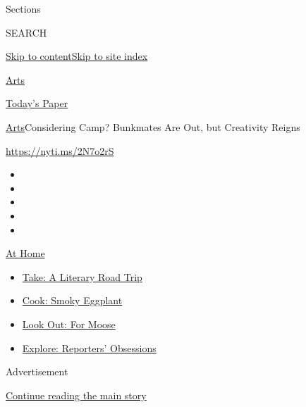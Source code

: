 Sections

SEARCH

\protect\hyperlink{site-content}{Skip to
content}\protect\hyperlink{site-index}{Skip to site index}

\href{https://www.nytimes.com/section/arts}{Arts}

\href{https://myaccount.nytimes.com/auth/login?response_type=cookie\&client_id=vi}{}

\href{https://www.nytimes.com/section/todayspaper}{Today's Paper}

\href{/section/arts}{Arts}\textbar{}Considering Camp? Bunkmates Are Out,
but Creativity Reigns

\url{https://nyti.ms/2N7o2rS}

\begin{itemize}
\item
\item
\item
\item
\item
\end{itemize}

\href{https://www.nytimes.com/spotlight/at-home?action=click\&pgtype=Article\&state=default\&region=TOP_BANNER\&context=at_home_menu}{At
Home}

\begin{itemize}
\tightlist
\item
  \href{https://www.nytimes.com/2020/07/28/books/time-for-a-literary-road-trip.html?action=click\&pgtype=Article\&state=default\&region=TOP_BANNER\&context=at_home_menu}{Take:
  A Literary Road Trip}
\item
  \href{https://www.nytimes.com/2020/07/29/magazine/bored-with-your-home-cooking-some-smoky-eggplant-will-fix-that.html?action=click\&pgtype=Article\&state=default\&region=TOP_BANNER\&context=at_home_menu}{Cook:
  Smoky Eggplant}
\item
  \href{https://www.nytimes.com/2020/07/27/travel/moose-michigan-isle-royale.html?action=click\&pgtype=Article\&state=default\&region=TOP_BANNER\&context=at_home_menu}{Look
  Out: For Moose}
\item
  \href{https://www.nytimes.com/interactive/2020/at-home/even-more-reporters-editors-diaries-lists-recommendations.html?action=click\&pgtype=Article\&state=default\&region=TOP_BANNER\&context=at_home_menu}{Explore:
  Reporters' Obsessions}
\end{itemize}

Advertisement

\protect\hyperlink{after-top}{Continue reading the main story}

